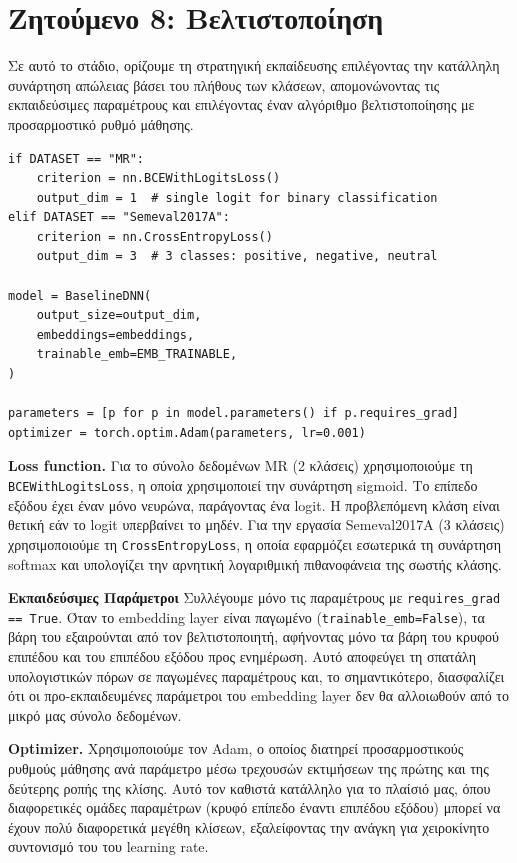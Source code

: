 \documentclass[12pt]{article}
\begin{document}
\section{Ζητούμενο 8: Βελτιστοποίηση}

Σε αυτό το στάδιο, ορίζουμε τη στρατηγική εκπαίδευσης επιλέγοντας την κατάλληλη συνάρτηση απώλειας βάσει του πλήθους των κλάσεων, απομονώνοντας τις εκπαιδεύσιμες παραμέτρους και επιλέγοντας έναν αλγόριθμο βελτιστοποίησης με προσαρμοστικό ρυθμό μάθησης.

\begin{lstlisting}
if DATASET == "MR":
    criterion = nn.BCEWithLogitsLoss()
    output_dim = 1  # single logit for binary classification
elif DATASET == "Semeval2017A":
    criterion = nn.CrossEntropyLoss()
    output_dim = 3  # 3 classes: positive, negative, neutral

model = BaselineDNN(
    output_size=output_dim,
    embeddings=embeddings,
    trainable_emb=EMB_TRAINABLE,
)

parameters = [p for p in model.parameters() if p.requires_grad]
optimizer = torch.optim.Adam(parameters, lr=0.001)
\end{lstlisting}

\textbf{Loss function.}
Για το σύνολο δεδομένων MR (2 κλάσεις) χρησιμοποιούμε τη \texttt{BCEWithLogitsLoss}, η οποία χρησιμοποιεί την συνάρτηση sigmoid. Το επίπεδο εξόδου έχει έναν μόνο νευρώνα, παράγοντας ένα logit. Η προβλεπόμενη κλάση είναι θετική εάν το logit υπερβαίνει το μηδέν. Για την εργασία Semeval2017A (3 κλάσεις) χρησιμοποιούμε τη \texttt{CrossEntropyLoss}, η οποία εφαρμόζει εσωτερικά τη συνάρτηση softmax και υπολογίζει την αρνητική λογαριθμική πιθανοφάνεια της σωστής κλάσης.

\textbf{Εκπαιδεύσιμες Παράμετροι}
Συλλέγουμε μόνο τις παραμέτρους με \texttt{requires\_grad == True}. Όταν το embedding layer είναι παγωμένο (\texttt{trainable\_emb=False}), τα βάρη του εξαιρούνται από τον βελτιστοποιητή, αφήνοντας μόνο τα βάρη του κρυφού επιπέδου και του επιπέδου εξόδου προς ενημέρωση. Αυτό αποφεύγει τη σπατάλη υπολογιστικών πόρων σε παγωμένες παραμέτρους και, το σημαντικότερο, διασφαλίζει ότι οι προ-εκπαιδευμένες παράμετροι του embedding layer δεν θα αλλοιωθούν από το μικρό μας σύνολο δεδομένων.

\textbf{Optimizer.}
Χρησιμοποιούμε τον Adam, ο οποίος διατηρεί προσαρμοστικούς ρυθμούς μάθησης ανά παράμετρο μέσω τρεχουσών εκτιμήσεων της πρώτης και της δεύτερης ροπής της κλίσης. Αυτό τον καθιστά κατάλληλο για το πλαίσιό μας, όπου διαφορετικές ομάδες παραμέτρων (κρυφό επίπεδο έναντι επιπέδου εξόδου) μπορεί να έχουν πολύ διαφορετικά μεγέθη κλίσεων, εξαλείφοντας την ανάγκη για χειροκίνητο συντονισμό του του learning rate.
\end{document}
